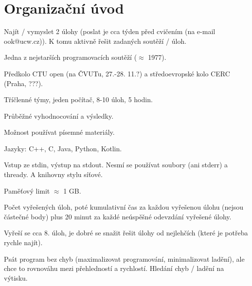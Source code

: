 \documentclass[12pt]{article}					%
\begin{document}
\section*{Organizační úvod}
    \begin{poznamka}
            Najít / vymyslet 2 úlohy (poslat je cca týden před cvičením (na e-mail ook@ucw.cz)). K tomu aktivně řešit zadaných soutěží / úloh.
    \end{poznamka}

    \begin{poznamka}[ICPC]
        Jedna z nejstarších programovacích soutěží ($\approx$ 1977).

        Předkolo CTU open (na ČVUTu, 27.-28. 11.?) a středoevropské kolo CERC (Praha, ???).
    \end{poznamka}

    \begin{poznamka}[Pravidla]
        Tříčlenné týmy, jeden počítač, 8-10 úloh, 5 hodin.

        Průběžné vyhodnocování a výsledky.

        Možnost používat písemné materiály.

        Jazyky: C++, C, Java, Python, Kotlin.

        Vstup ze stdin, výstup na stdout. Nesmí se používat soubory (ani stderr) a thready. A knihovny stylu síťové.

        Paměťový limit $\approx$ 1 GB.
    \end{poznamka}

    \begin{poznamka}[Hodnocení]
        Počet vyřešených úloh, poté kumulativní čas za každou vyřešenou úlohu (nejsou částečné body) plus 20 minut za každé neúspěšné odevzdání vyřešené úlohy.
    \end{poznamka}

    \begin{poznamka}[Strategie]
        Vyřeší se cca 8. úloh, je dobré se snažit řešit úlohy od nejlehčích (které je potřeba rychle najít).
    \end{poznamka}

    \begin{poznamka}
        Psát program bez chyb (maximalizovat programování, minimalizovat ladění), ale chce to rovnováhu mezi přehledností a rychlostí. Hledání chyb / ladění na výtisku.
    \end{poznamka}
    
\end{document}
